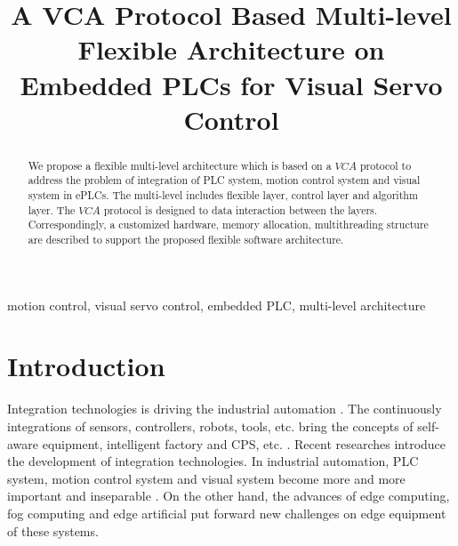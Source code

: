 \documentclass[journal,UTF8]{IEEEtran}
\begin{document}
%
\title{A VCA Protocol Based Multi-level Flexible Architecture on Embedded PLCs for Visual Servo Control }

\maketitle


\begin{abstract}
We propose a flexible multi-level architecture which is based on a $VCA$ protocol to address the problem of integration of PLC system, motion control system and visual system in ePLCs. The multi-level includes flexible layer, control layer and algorithm layer. The $VCA$ protocol is designed to data interaction between the layers. Correspondingly, a customized hardware, memory allocation, multithreading structure are described to support the proposed flexible software architecture.
\end{abstract}

\begin{IEEEkeywords}
motion control, visual servo control, embedded PLC, multi-level architecture
\end{IEEEkeywords}

%
\IEEEpeerreviewmaketitle



\section{Introduction}
Integration technologies is driving the industrial automation \cite{Kazmierkowski2007Integration}. The continuously integrations of sensors, controllers, robots, tools, etc. bring the concepts of self-aware equipment, intelligent factory and CPS, etc. \cite{Wan2018An,Chekired2018Industrial}.  Recent researches \cite{Colombo2006An,Vaccaro2010An,Dean2017Integration} introduce the development of integration technologies. In industrial automation, PLC system,  motion control system and visual system become more and more important and inseparable \cite{Feng2002Integrating,Chang2006Motion,Feng2005Practical}. On the other hand, the advances of edge computing, fog computing and edge artificial\cite{Hu2017Fog,Hou2018Green,PaceAn} put forward new challenges on edge equipment of these systems.
\end{document}
